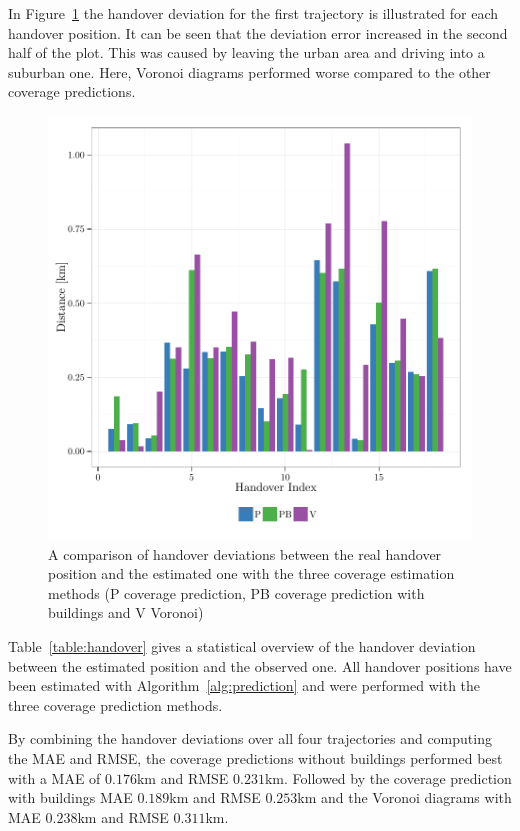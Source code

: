 In Figure~\ref{fig:handoverdeviation} the handover deviation for the first trajectory is illustrated for each handover position. It can be seen that the deviation error increased in the second half of the plot. This was caused by leaving the urban area and driving into a suburban one. Here, Voronoi diagrams performed worse compared to the other coverage predictions.

\begin{figure}[h!]
		\label{fig:handoverdeviation}
		\caption{ A comparison of handover deviations between the real handover position and the estimated one with the three coverage estimation methods (P coverage prediction, PB coverage prediction with buildings and V Voronoi)
		}
		\includegraphics[width=0.9\columnwidth]{images/563_HandoverDeviation}
\end{figure}

Table~\ref{table:handover} gives a statistical overview of the handover deviation between the estimated position and the observed one. All handover positions have been estimated with Algorithm~\ref{alg:prediction} and were performed with the three coverage prediction methods. 

By combining the handover deviations over all four trajectories and computing the MAE and RMSE, the coverage predictions without buildings performed best with a MAE of $0.176$km and RMSE $0.231$km. Followed by the coverage prediction with buildings MAE $0.189$km and RMSE $0.253$km and the Voronoi diagrams with MAE $0.238$km and RMSE $0.311$km.

